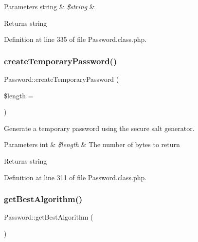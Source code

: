 \begin{DoxyParams}[1]{Parameters}
string & {\em \$string} & \\
\hline
\end{DoxyParams}
\begin{DoxyReturn}{Returns}
string 
\end{DoxyReturn}


Definition at line 335 of file Password.\+class.\+php.

\hypertarget{classPassword_aef378e672d57dbe203242230c3cc45a9}{}\label{classPassword_aef378e672d57dbe203242230c3cc45a9} 
\subsubsection{\texorpdfstring{create\+Temporary\+Password()}{createTemporaryPassword()}}
{\footnotesize\ttfamily Password\+::create\+Temporary\+Password (\begin{DoxyParamCaption}\item[{}]{\$length = {} }\end{DoxyParamCaption})}



Generate a temporary password using the secure salt generator. 


\begin{DoxyParams}[1]{Parameters}
int & {\em \$length} & The number of bytes to return \\
\hline
\end{DoxyParams}
\begin{DoxyReturn}{Returns}
string 
\end{DoxyReturn}


Definition at line 311 of file Password.\+class.\+php.

\hypertarget{classPassword_a191be9b3e77eea80b6d97b7bfaaba288}{}\label{classPassword_a191be9b3e77eea80b6d97b7bfaaba288} 
\subsubsection{\texorpdfstring{get\+Best\+Algorithm()}{getBestAlgorithm()}}
{\footnotesize\ttfamily Password\+::get\+Best\+Algorithm (\begin{DoxyParamCaption}{ }\end{DoxyParamCaption})}



